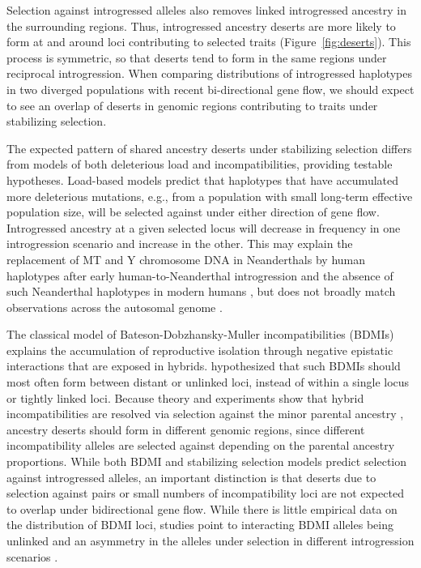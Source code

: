 \documentclass{article}
\begin{document}
Selection against introgressed alleles also removes linked introgressed
ancestry in the surrounding regions. Thus, introgressed ancestry deserts are
more likely to form at and around loci contributing to selected traits
(Figure~\ref{fig:deserts}). This process is symmetric, so that deserts tend to
form in the same regions under reciprocal introgression. When comparing
distributions of introgressed haplotypes in two diverged populations with
recent bi-directional gene flow, we should expect to see an overlap of deserts
in genomic regions contributing to traits under stabilizing selection.

The expected pattern of shared ancestry deserts under stabilizing selection
differs from models of both deleterious load and incompatibilities, providing
testable hypotheses. Load-based models predict that haplotypes that have
accumulated more deleterious mutations, e.g., from a population with small
long-term effective population size, will be selected against under either
direction of gene flow. Introgressed ancestry at a given selected locus will
decrease in frequency in one introgression scenario and increase in the other.
This may explain the replacement of MT and Y chromosome DNA in Neanderthals by
human haplotypes after early human-to-Neanderthal introgression and the absence
of such Neanderthal haplotypes in modern humans \citep{posth2017deeply,
petr2020evolutionary}, but does not broadly match observations across the
autosomal genome \citep{harris2023diverse}.

The classical model of Bateson-Dobzhansky-Muller incompatibilities (BDMIs)
\citep{bateson1909heredity, dobzhansky1936studies, muller1942isolating}
explains the accumulation of reproductive isolation through negative epistatic
interactions that are exposed in hybrids. \citet{muller1942isolating}
hypothesized that such BDMIs should most often form between distant or unlinked
loci, instead of within a single locus or tightly linked loci. Because theory
and experiments show that hybrid incompatibilities are resolved via selection
against the minor parental ancestry \citep{matute2020rapid, moran2021genomic},
ancestry deserts should form in different genomic regions, since different
incompatibility alleles are selected against depending on the parental ancestry
proportions. While both BDMI and stabilizing selection models predict selection
against introgressed alleles, an important distinction is that deserts due to
selection against pairs or small numbers of incompatibility loci are not
expected to overlap under bidirectional gene flow. While there is little
empirical data on the distribution of BDMI loci, studies point to interacting
BDMI alleles being unlinked \citep{presgraves2003fine, li2022imbalanced} and an
asymmetry in the alleles under selection in different introgression scenarios
\citep{maheshwari2011genetics, moran2021genomic}.
\end{document}
